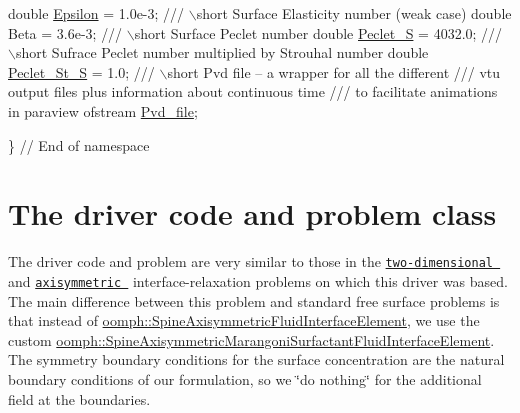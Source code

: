 \begin{DoxyCodeInclude}
\textcolor{comment}{} \textcolor{keywordtype}{double} \hyperlink{namespaceGlobal__Physical__Variables_a28f21de3d342b1dab2fa0be362c6a944}{Epsilon} = 1.0e-3;
\textcolor{comment}{}
\textcolor{comment}{ /// \(\backslash\)short Surface Elasticity number (weak case)}
\textcolor{comment}{} \textcolor{keywordtype}{double} Beta = 3.6e-3;
\textcolor{comment}{}
\textcolor{comment}{ /// \(\backslash\)short Surface Peclet number}
\textcolor{comment}{} \textcolor{keywordtype}{double} \hyperlink{namespaceGlobal__Physical__Variables_a99dc85e71075cd6efb06e692d8a15bcd}{Peclet\_S} = 4032.0;
\textcolor{comment}{}
\textcolor{comment}{ /// \(\backslash\)short Sufrace Peclet number multiplied by Strouhal number}
\textcolor{comment}{} \textcolor{keywordtype}{double} \hyperlink{namespaceGlobal__Physical__Variables_abec1e1c8c78ade3a7b2e7396321c6466}{Peclet\_St\_S} = 1.0; 
 \textcolor{comment}{}
\textcolor{comment}{ /// \(\backslash\)short Pvd file -- a wrapper for all the different}
\textcolor{comment}{ /// vtu output files plus information about continuous time}
\textcolor{comment}{ /// to facilitate animations in paraview}
\textcolor{comment}{} ofstream \hyperlink{namespaceGlobal__Physical__Variables_a4f2fe790aa186202e4e2d5f6ee21d7f4}{Pvd\_file};

\} \textcolor{comment}{// End of namespace}

\end{DoxyCodeInclude}




 

\hypertarget{index_main}{}\section{The driver code and problem class}\label{index_main}
The driver code and problem are very similar to those in the \href{../../../navier_stokes/single_layer_free_surface/html/index.html}{\tt two-\/dimensional } and \href{../../../axisym_navier_stokes/two_layer_interface_axisym/html/index.html}{\tt axisymmetric } interface-\/relaxation problems on which this driver was based. The main difference between this problem and standard free surface problems is that instead of \hyperlink{classoomph_1_1SpineAxisymmetricFluidInterfaceElement}{oomph\+::\+Spine\+Axisymmetric\+Fluid\+Interface\+Element}, we use the custom \hyperlink{classoomph_1_1SpineAxisymmetricMarangoniSurfactantFluidInterfaceElement}{oomph\+::\+Spine\+Axisymmetric\+Marangoni\+Surfactant\+Fluid\+Interface\+Element}. The symmetry boundary conditions for the surface concentration are the natural boundary conditions of our formulation, so we \char`\"{}do
 nothing\char`\"{} for the additional field at the boundaries.

